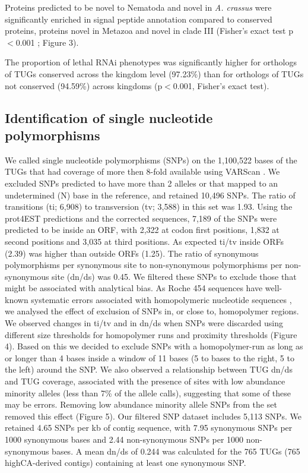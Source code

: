 \documentclass[10pt]{bmc_article}
\newenvironment{bmcformat}{\begin{raggedright}\baselineskip20pt\sloppy\setboolean{publ}{false}}{\end{raggedright}\baselineskip20pt\sloppy}
\begin{document}
\begin{bmcformat}
Proteins predicted to be novel to Nematoda and novel in
\textit{A. crassus} were significantly enriched in signal peptide
annotation compared to conserved proteins, proteins novel in Metazoa
and novel in clade III (Fisher's exact test p$<$0.001 ; Figure 3).

The proportion of lethal RNAi phenotypes was significantly higher for
orthologs of TUGs conserved across the kingdom level
(97.23\%) than for orthologs of
TUGs not conserved (94.59\%) across
kingdoms (p$<$0.001, Fisher's exact test).

\subsection*{Identification of single nucleotide polymorphisms}

We called single nucleotide polymorphisms (SNPs) on the
1,100,522 bases of the TUGs that had coverage of more
then 8-fold available using VARScan \cite{pmid19542151}. We excluded
SNPs predicted to have more than 2 alleles or that mapped to an
undetermined (N) base in the reference, and retained
10,496 SNPs. The ratio of transitions (ti;
6,908) to transversion (tv;
3,588) in this set was
1.93. Using the prot4EST
predictions and the corrected sequences, 7,189
of the SNPs were predicted to be inside an ORF, with
2,322 at codon first positions,
1,832 at second positions and
3,035 at third positions. As expected ti/tv
inside ORFs (2.39) was higher than outside ORFs
(1.25). The ratio of synonymous polymorphisms per
synonymous site to non-synonymous polymorphisms per non-synonymous
site (dn/ds) was 0.45. We filtered these SNPs to exclude
those that might be associated with analytical bias. As Roche 454
sequences have well-known systematic errors associated with
homopolymeric nucleotide sequences \cite{pmid21685085}, we analysed
the effect of exclusion of SNPs in, or close to, homopolymer
regions. We observed changes in ti/tv and in dn/ds when SNPs were
discarded using different size thresholds for homopolymer runs and
proximity thresholds (Figure 4). Based on this we decided to
exclude SNPs with a homopolymer-run as long as or longer than 4 bases
inside a window of 11 bases (5 to bases to the right, 5 to the left)
around the SNP. We also observed a relationship between TUG dn/ds and
TUG coverage, associated with the presence of sites with low abundance
minority alleles (less than 7\% of the allele calls), suggesting that
some of these may be errors. Removing low abundance minority allele
SNPs from the set removed this effect (Figure 5).  Our filtered SNP
dataset includes 5,113 SNPs. We retained
4.65 SNPs per kb of contig sequence, with
7.95 synonymous SNPs per 1000 synonymous bases and
2.44 non-synonymous SNPs per 1000 non-synonymous
bases. A mean dn/ds of 0.244 was
calculated for the 765 TUGs
(765 highCA-derived contigs)
containing at least one synonymous SNP.


\end{bmcformat}
\end{document}

